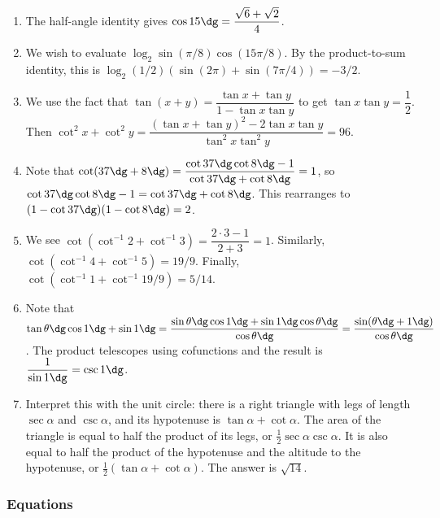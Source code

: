 \documentclass[10pt,paper=letter]{scrartcl}
\begin{document}
\begin{enumerate}

\item The half-angle identity gives $\cos 15\dg = \dfrac{\sqrt{6}+\sqrt{2}}{4}$.

\item We wish to evaluate $\log_2 \sin(\pi/8)\cos(15\pi/8)$. By the product-to-sum identity, this is $\log_2 (1/2)(\sin(2\pi) + \sin(7\pi/4)) = -3/2$.

\item We use the fact that $\tan(x+y) = \dfrac{\tan x + \tan y}{1 - \tan x \tan y}$ to get $\tan x \tan y = \dfrac{1}{2}$. Then $\cot^2 x + \cot^2 y = \dfrac{(\tan x + \tan y)^2 - 2\tan x \tan y}{\tan^2 x \tan^2 y} = 96$.

\item Note that $\cot(37\dg + 8\dg) = \dfrac{\cot 37\dg \cot 8\dg - 1}{\cot 37\dg + \cot 8\dg} = 1$, so $\cot 37\dg \cot 8\dg - 1 = \cot 37\dg + \cot 8\dg$. This rearranges to $(1 - \cot 37\dg)(1 - \cot 8\dg) = 2$.

\item We see $\cot(\cot^{-1}2 + \cot^{-1}3) = \dfrac{2\cdot 3 - 1}{2 + 3} = 1$. Similarly, $\cot(\cot^{-1}4 + \cot^{-1}5) = 19/9$. Finally, $\cot(\cot^{-1}1 + \cot^{-1}19/9) = 5/14$.

\item Note that $\tan \theta\dg \cos 1\dg + \sin 1\dg = \dfrac{\sin\theta\dg \cos 1\dg + \sin 1\dg \cos \theta\dg}{\cos \theta\dg} = \dfrac{\sin(\theta\dg + 1\dg)}{\cos \theta\dg}$. The product telescopes using cofunctions and the result is $\dfrac{1}{\sin 1\dg} = \csc 1\dg$.

\item Interpret this with the unit circle: there is a right triangle with legs of length $\sec \alpha$ and $\csc \alpha$, and its hypotenuse is $\tan \alpha + \cot \alpha$. The area of the triangle is equal to half the product of its legs, or $\frac{1}{2}\sec \alpha \csc \alpha$. It is also equal to half the product of the hypotenuse and the altitude to the hypotenuse, or $\frac{1}{2}(\tan \alpha + \cot \alpha)$. The answer is $\sqrt{14}$.

\end{enumerate}

\subsubsection*{Equations}
\end{document}
